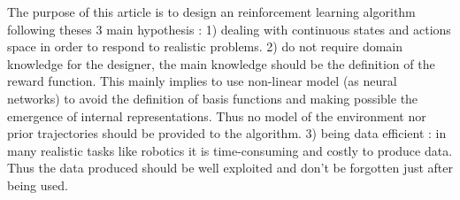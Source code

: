 The purpose of this article is to design an reinforcement learning algorithm following theses 3 main hypothesis :
1) dealing with continuous states and actions space in order to respond to realistic problems.
2) do not require domain knowledge for the designer, the main knowledge should be the definition of the reward function.
This mainly implies to use non-linear model (as neural networks) to avoid the definition of basis functions and
making possible the emergence of internal representations. Thus no model of the environment nor prior trajectories should
be provided to the algorithm.
3) being data efficient : in many realistic tasks like robotics it is time-consuming and costly to produce data.
Thus the data produced should be well exploited and don't be forgotten just after being used.




